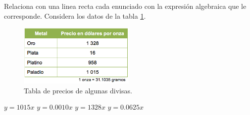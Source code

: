 Relaciona con una linea recta cada enunciado con la expresión algebraica que le corresponde. Considera los datos de la tabla \ref{fig:SINMAT1_U3_AC72_IMG1}.
\begin{figure}[H]
    \centering
    \includegraphics[width=0.5\textwidth]{../images/SINMAT1_U3_AC72_IMG1}
    \caption{Tabla de precios de algunas divisas.}
    \label{fig:SINMAT1_U3_AC72_IMG1}
\end{figure}
\begin{multicols}{2}
    \begin{choices}
        \choice $y = 1 015x$
        \choice $y = 0.0010x$
        \choice $y = 1 328x$
        \choice $y = 0.0625x$
    \end{choices}
    \columnbreak
\end{multicols}